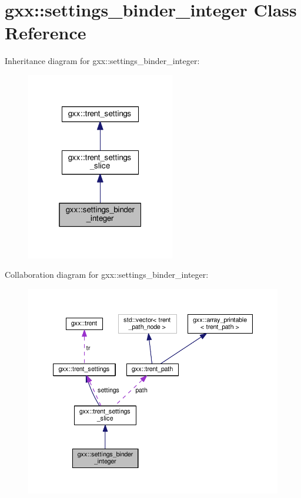 \hypertarget{classgxx_1_1settings__binder__integer}{}\section{gxx\+:\+:settings\+\_\+binder\+\_\+integer Class Reference}
\label{classgxx_1_1settings__binder__integer}


Inheritance diagram for gxx\+:\+:settings\+\_\+binder\+\_\+integer\+:
\nopagebreak
\begin{figure}[H]
\begin{center}
\leavevmode
\includegraphics[width=184pt]{classgxx_1_1settings__binder__integer__inherit__graph}
\end{center}
\end{figure}


Collaboration diagram for gxx\+:\+:settings\+\_\+binder\+\_\+integer\+:
\nopagebreak
\begin{figure}[H]
\begin{center}
\leavevmode
\includegraphics[width=350pt]{classgxx_1_1settings__binder__integer__coll__graph}
\end{center}
\end{figure}
